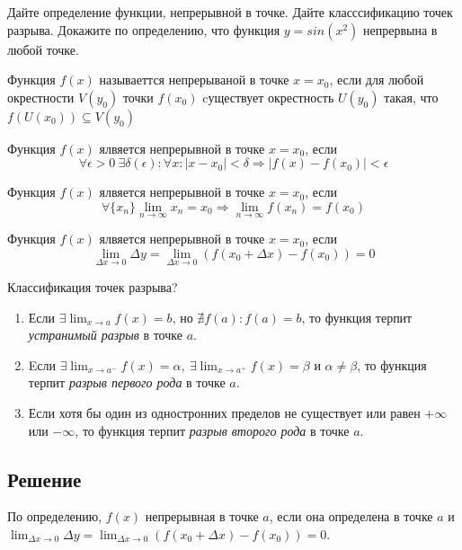 Дайте определение функции, непрерывной в точке. Дайте класссификацию точек разрыва. Докажите по определению, что функция $y = sin(x^2)$ непрервына в любой точке.

\begin{definition}
	Функция $f(x)$ называеттся непрерываной в точке $x = x_0$, если для любой окрестности $V(y_0)$ точки $f(x_0)$ cуществует окрестность $U(y_0)$ такая, что $f(U(x_0))\subseteq V(y_0)$
\end{definition}

\begin{definition}[по Коши]
	Функция $f(x)$ ялвяется непрерывной в точке $x = x_0$, если
	\[
	\forall \epsilon > 0 \ \exists \delta(\epsilon): 
	\forall x: |x - x_0| < \delta \Rightarrow |f(x) - f(x_0)| < \epsilon
	\]
\end{definition}

\begin{definition}[по Гейне]
	Функция $f(x)$ ялвяется непрерывной в точке $x = x_0$, если
	\[
	\forall \{x_n\} \lim_{n \rightarrow \infty} x_n = x_0 \Rightarrow \lim_{n \rightarrow \infty} f(x_n) = f(x_0)
	\]
\end{definition}
\begin{definition}
	Функция $f(x)$ ялвяется непрерывной в точке $x = x_0$, если
	\[
	\lim_{\Delta x \rightarrow 0} \Delta y = \lim_{\Delta x \rightarrow 0} \left(f(x_0 + \Delta x) - f(x_0) \right) = 0
	\]
\end{definition}


Классификация точек разрыва?
\begin{enumerate}
	\item Если $\exists \lim_{x \rightarrow a} f(x) = b$, но $\nexists f(a): f(a) = b$, то функция терпит \textit{устранимый разрыв} в точке $a$.
	
	\item Eсли $\exists \lim_{x \rightarrow a^{-}} f(x) = \alpha, \ \exists \lim_{x \rightarrow a^{+}} f(x) = \beta$ и $\alpha \neq \beta$, то функция терпит \textit{разрыв первого рода} в точке $a$.
	
	\item Если хотя бы один из одностронних пределов не существует или равен $+ \infty$ или $-\infty$, то функция терпит \textit{разрыв второго рода} в точке $a$.
\end{enumerate}


\subsection*{Решение}
По определению, $f(x)$ непрерывная в точке $a$, если она определена в точке $a$ и $\lim_{\Delta x \rightarrow 0} \Delta y = \lim_{\Delta x \rightarrow 0} \left(f(x_0 + \Delta x) - f(x_0) \right) = 0$.

